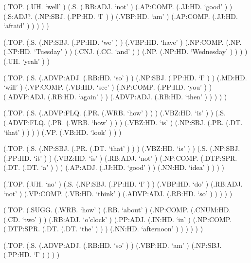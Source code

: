 \documentclass[10pt]{article}
\begin{document}
\begin{parsetree}  (.TOP. (.UH. `well' ) (.S. (.RB:ADJ. `not' ) (.AP:COMP. (.JJ:HD. `good' ) ) (.S:ADJ?. (.NP:SBJ. (.PP:HD. `I' ) ) (.VBP:HD. `am' ) (.AP:COMP. (.JJ:HD. `afraid' ) ) ) ) ) \end{parsetree}

\begin{parsetree}  (.TOP. (.S. (.NP:SBJ. (.PP:HD. `we' ) ) (.VBP:HD. `have' ) (.NP:COMP. (.NP. (.NP:HD. `Tuesday' ) ) (.CNJ. (.CC. `and' ) ) (.NP. (.NP:HD. `Wednesday' ) ) ) ) (.UH. `yeah' ) ) \end{parsetree}

\begin{parsetree}  (.TOP. (.S. (.ADVP:ADJ. (.RB:HD. `so' ) ) (.NP:SBJ. (.PP:HD. `I' ) ) (.MD:HD. `will' ) (.VP:COMP. (.VB:HD. `see' ) (.NP:COMP. (.PP:HD. `you' ) ) (.ADVP:ADJ. (.RB:HD. `again' ) ) (.ADVP:ADJ. (.RB:HD. `then' ) ) ) ) ) \end{parsetree}

\begin{parsetree}  (.TOP. (.S. (.ADVP:FLQ. (.PR. (.WRB. `how' ) ) ) (.VBZ:HD. `is' ) ) (.S. (.ADVP:FLQ. (.PR. (.WRB. `how' ) ) ) (.VBZ:HD. `is' ) (.NP:SBJ. (.PR. (.DT. `that' ) ) ) ) (.VP. (.VB:HD. `look' ) ) ) \end{parsetree}

\begin{parsetree}  (.TOP. (.S. (.NP:SBJ. (.PR. (.DT. `that' ) ) ) (.VBZ:HD. `is' ) ) (.S. (.NP:SBJ. (.PP:HD. `it' ) ) (.VBZ:HD. `is' ) (.RB:ADJ. `not' ) (.NP:COMP. (.DTP:SPR. (.DT. (.DT. `a' ) ) ) (.AP:ADJ. (.JJ:HD. `good' ) ) (.NN:HD. `idea' ) ) ) ) \end{parsetree}

\begin{parsetree}  (.TOP. (.UH. `no' ) (.S. (.NP:SBJ. (.PP:HD. `I' ) ) (.VBP:HD. `do' ) (.RB:ADJ. `not' ) (.VP:COMP. (.VB:HD. `think' ) (.ADVP:ADJ. (.RB:HD. `so' ) ) ) ) ) \end{parsetree}

\begin{parsetree}  (.TOP. (.SUGG. (.WRB. `how' ) (.RB. `about' ) (.NP:COMP. (.CNUM:HD. (.CD. `two' ) ) (.RB:ADJ. `o'clock' ) (.PP:ADJ. (.IN:HD. `in' ) (.NP:COMP. (.DTP:SPR. (.DT. (.DT. `the' ) ) ) (.NN:HD. `afternoon' ) ) ) ) ) ) \end{parsetree}

\begin{parsetree}  (.TOP. (.S. (.ADVP:ADJ. (.RB:HD. `so' ) ) (.VBP:HD. `am' ) (.NP:SBJ. (.PP:HD. `I' ) ) ) ) \end{parsetree}
\end{document}
